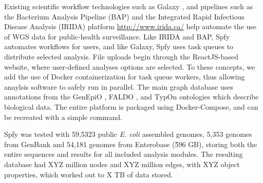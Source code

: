 \documentclass{article}
\begin{document}
Existing scientific workflow technologies such as Galaxy \cite{goecks2010galaxy}, and pipelines such as the Bacterium Analysis Pipeline (BAP) \cite{thomsen2016bacterial} and the Integrated Rapid Infectious Disease Analysis (IRIDA) platform \url{http://www.irida.ca/} help automate the use of WGS data for public-health surveillance.
Like IRIDA and BAP, Spfy automates workflows for users, and like Galaxy, Spfy uses task queues to distribute selected analysis. File uploads begin through the ReactJS-based website, where user-defined analyses options are selected. To these concepts, we add the use of Docker containerization for task queue workers, thus allowing anaylsis software to safely run in parallel. The main graph database uses annotations from the GenEpiO \cite{griffiths2017context}, FALDO \cite{bolleman2016faldo}, and TypOn \cite{vaz2014typon} ontologies which describe biological data. The entire platform is packaged using Docker-Compose, and can be recreated with a simple command.

Spfy was tested with 59,5323 public \textit{E. coli} assembled genomes, 5,353 genomes from GenBank and 54,181 genomes from Enterobase (\~596 GB), storing both the entire sequences and results for all included analysis modules.
The resulting database had XYZ million nodes and XYZ million edges, with XYZ object properties, which worked out to X TB of data stored.


\end{document}
